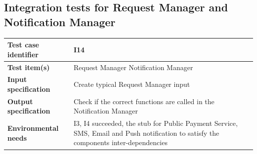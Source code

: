\documentclass[a4paper,11pt]{report} %
\begin{document}
		\subsection{Integration tests for Request Manager and Notification Manager}
			\begin{minipage}{\linewidth}
			\end{minipage}		
		\begin{center}
			\renewcommand{\arraystretch}{1.2}
			\setlength{\tabcolsep}{24pt}
			\begin{tabular}{ l  p{9cm}}\hline
				\textbf{Test case identifier} & I14\\\hline
				\textbf{Test item(s)} & Request Manager \textrightarrow Notification Manager\\\hline
				\textbf{Input specification} & Create typical Request Manager input \\\hline
				\textbf{Output specification} & Check if the correct functions are called in the Notification Manager\\\hline
				\textbf{Environmental needs} &  I3, I4 succeeded, the stub for Public Payment Service, SMS, Email and Push notification to satisfy the components inter-dependencies\\\hline
			\end{tabular}
		\end{center}	
		
\end{document}
